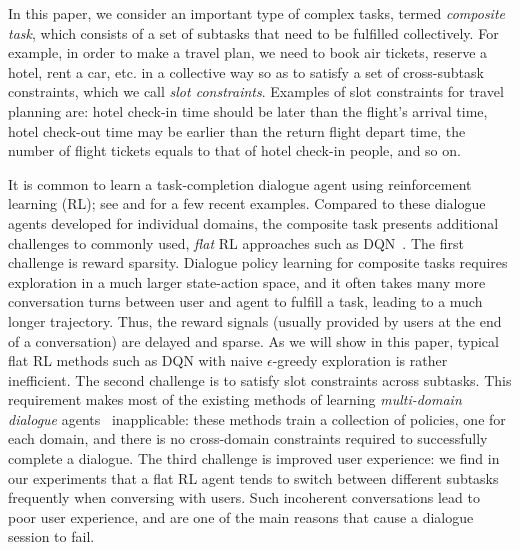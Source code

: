 \documentclass[11pt,letterpaper]{article}
\begin{document}
In this paper, we consider an important type of complex tasks, termed \emph{composite task}, which consists of a set of subtasks that need to be fulfilled collectively. For example, in order to make a travel plan, we need to book air tickets, reserve a hotel, rent a car, etc. in a collective way so as to satisfy a set of cross-subtask constraints, which we call \emph{slot constraints}. Examples of slot constraints for travel planning are: hotel check-in time should be later than the flight's arrival time, hotel check-out time may be earlier than the return flight depart time, the number of flight tickets equals to that of hotel check-in people, and so on.


It is common to learn a task-completion dialogue agent using reinforcement learning (RL); see \citet{su2016continuously,cuayahuitl2017simpleds,williams2017hybrid,Dhingra17EndToEnd} and \citet{li2017end} for a few recent examples. Compared to these dialogue agents developed for individual domains, the composite task presents additional challenges to commonly used, \emph{flat} RL approaches such as DQN~\cite{DBLP:journals/nature/MnihKSRVBGRFOPB15}. The first challenge is reward sparsity. 
Dialogue policy learning for composite tasks requires exploration in a much larger state-action space, and it often takes many more conversation turns between user and agent to fulfill a task, leading to a much longer trajectory. Thus, the reward signals (usually provided by users at the end of a conversation) are delayed and sparse. As we will show in this paper, typical flat RL methods such as DQN with naive $\epsilon$-greedy exploration is rather inefficient. The second challenge is to satisfy slot constraints across subtasks. This requirement makes most of the existing methods of learning \emph{multi-domain dialogue} agents~\cite{cuayahuitl2009hierarchical,DBLP:conf/asru/GasicMSVWY15} inapplicable: these methods train a collection of policies, one for each domain, and there is no cross-domain constraints required to successfully complete a dialogue. 
The third challenge is improved user experience: we find in our experiments that a flat RL agent tends to switch between different subtasks frequently when conversing with users. Such incoherent conversations lead to poor user experience, and are one of the main reasons that cause a dialogue session to fail.
\end{document}
